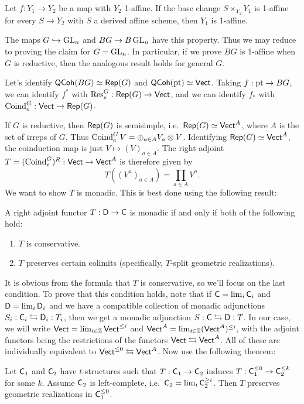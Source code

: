 \documentclass{article}
\begin{document}
\begin{prop}[3.2.7 in Gaitsgory]
	Let $f: Y_1 \to Y_2$ be a map with $Y_2$ 1-affine.
	If the base change $S \times_{Y_2} Y_1$ is 1-affine for every $S \to Y_2$ with $S$ a derived affine scheme, then $Y_1$ is 1-affine.
\end{prop}

The maps $G \hookrightarrow \operatorname{GL}_n$ and $BG \to B\operatorname{GL}_n$ have this property.
Thus we may reduce to proving the claim for $G = \operatorname{GL}_n$.
In particular, if we prove $BG$ is 1-affine when $G$ is reductive, then the analogous result holds for general $G$.

Let's identify $\mathsf{QCoh}(BG) \simeq \mathsf{Rep}(G)$ and $\mathsf{QCoh}(\operatorname{pt}) \simeq \mathsf{Vect}$.
Taking $f: \operatorname{pt} \to BG$, we can identify $f^*$ with $\operatorname{Res}_e^G: \mathsf{Rep}(G) \to \mathsf{Vect}$, and we can identify $f_*$ with $\operatorname{Coind}_e^G: \mathsf{Vect} \to \mathsf{Rep}(G)$.

If $G$ is reductive, then $\mathsf{Rep}(G)$ is semisimple, i.e.\ $\mathsf{Rep}(G) \simeq \mathsf{Vect}^A$, where $A$ is the set of irreps of $G$.
Thus $\operatorname{Coind}_e^G V = \oplus_{a \in A} V_a \otimes V$.
Identifying $\mathsf{Rep}(G) \simeq \mathsf{Vect}^A$, the coinduction map is just $V \mapsto (V)_{a \in A}$.
The right adjoint $T = (\operatorname{Coind}_e^G)^R : \mathsf{Vect} \to \mathsf{Vect}^A$ is therefore given by
\[
	T((V^a)_{a \in A}) = \prod_{a \in A} V^a.
\]
We want to show $T$ is monadic.
This is best done using the following result:

\begin{thm}
	A right adjoint functor $T: \mathsf{D} \to \mathsf{C}$ is monadic if and only if both of the following hold:
	\begin{enumerate}
		\item $T$ is conservative.
		\item $T$ preserves certain colimits (specifically, $T$-split geometric realizations).
	\end{enumerate}
\end{thm}

It is obvious from the formula that $T$ is conservative, so we'll focus on the last condition.
To prove that this condition holds, note that if $\mathsf{C} = \lim_i \mathsf{C}_i$ and $\mathsf{D} = \lim_i \mathsf{D}_i$ and we have a compatible collection of monadic adjunctions $S_i: \mathsf{C}_i \leftrightarrows \mathsf{D}_i: T_i$, then we get a monadic adjunction $S: \mathsf{C} \leftrightarrows \mathsf{D}: T$.
In our case, we will write $\mathsf{Vect} = \lim_{i \in \mathbb{Z}} \mathsf{Vect}^{\leq i}$ and $\mathsf{Vect}^A = \lim_{i \in \mathbb{Z}} (\mathsf{Vect}^A)^{\leq i}$, with the adjoint functors being the restrictions of the functors $\mathsf{Vect} \leftrightarrows \mathsf{Vect}^A$.
All of these are individually equivalent to $\mathsf{Vect}^{\leq 0} \leftrightarrows \mathsf{Vect}^A$.
Now use the following theorem:

\begin{thm}
	Let $\mathsf{C}_1$ and $\mathsf{C}_2$ have $t$-structures such that $T: \mathsf{C}_1 \to \mathsf{C}_2$ induces $T: \mathsf{C}_1^{\leq 0} \to \mathsf{C}_2^{\leq k}$ for some $k$.
	Assume $\mathsf{C}_2$ is left-complete, i.e.\ $\mathsf{C}_2 = \lim_i \mathsf{C}_2^{\geq i}$.
	Then $T$ preserves geometric realizations in $\mathsf{C}_1^{\leq 0}$.
\end{thm}
\end{document}
